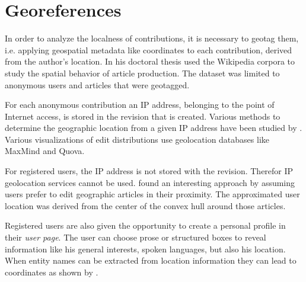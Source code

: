 \section{Georeferences}\label{sec:georeference}

In order to analyze the localness of contributions, it is necessary to geotag them, i.e. applying geospatial metadata like coordinates to each contribution, derived from the author's location.
In his doctoral thesis \textcite{hardy2011volunteered} used the Wikipedia corpora to study the spatial behavior of article production.
The dataset was limited to anonymous users and articles that were geotagged.

For each anonymous contribution an IP address, belonging to the point of Internet access, is stored in the revision that is created.
Various methods to determine the geographic location from a given IP address have been studied by \textcite{muir2009internet}.
Various visualizations  of edit distributions use geolocation databases like MaxMind and Quova.

For registered users, the IP address is not stored with the revision.
Therefor IP geolocation services cannot be used.
\textcite{lieberman2009you} found an interesting approach by assuming users prefer to edit geographic articles in their proximity.
The approximated user location was derived from the center of the convex hull around those articles.

Registered users are also given the opportunity to create a personal profile in their \emph{user page}.
The user can choose prose or structured boxes to reveal information like his general interests, spoken languages, but also his location.
When entity names can be extracted from location information they can lead to coordinates as shown by \textcite{hecht2010localness}.